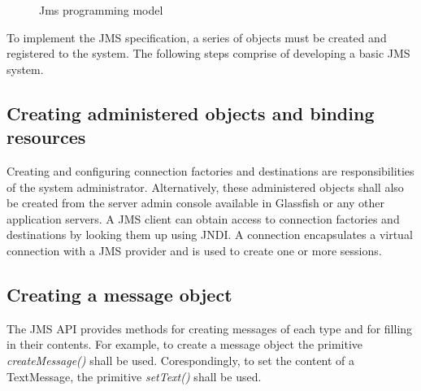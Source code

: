 \documentclass[9pt,twocolumn,twoside]{../../styles/osajnl}
\begin{document}
\begin{figure}[htbp]
\centering
{}
\caption{Jms programming model \cite{www-jms-fischli-article}}
\label{fig:JMS Programming Objects}
\end{figure}

To implement the JMS specification, a series of objects must be
created and registered to the system. The following steps comprise of
developing a basic JMS system.

\subsection{Creating administered objects and binding resources}

Creating and configuring connection factories and destinations are
responsibilities of the system administrator. Alternatively, these
administered objects shall also be created from the server admin
console available in Glassfish or any other application servers.  A
JMS client can obtain access to connection factories and destinations
by looking them up using JNDI.
A connection encapsulates a virtual connection with a JMS provider
and is used to create one or more sessions.

\subsection{Creating a message object}

The JMS API provides methods for creating messages of each type and
for filling in their contents. For example, to create a message object
the primitive \emph{createMessage()} shall be used. Corespondingly, to
set the content of a TextMessage, the primitive \emph{setText()} shall
be used.
\end{document}
